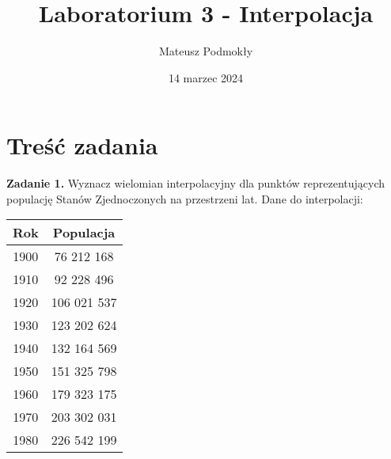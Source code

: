 \documentclass[11pt]{scrartcl}
\title{Laboratorium 3 - Interpolacja}
\author{Mateusz Podmokły}
\date{14 marzec 2024}
\begin{document}
    \maketitle

    \section{Treść zadania}
    \textbf{Zadanie 1.} Wyznacz wielomian interpolacyjny dla punktów
    reprezentujących populację Stanów Zjednoczonych na przestrzeni
    lat. Dane do interpolacji:

    \begin{table}[H]
        \centering
        \begin{tabular}{c | c}
            Rok & Populacja \\
            \hline
            1900 & 76 212 168 \\
            1910 & 92 228 496 \\
            1920 & 106 021 537 \\
            1930 & 123 202 624 \\
            1940 & 132 164 569 \\
            1950 & 151 325 798 \\
            1960 & 179 323 175 \\
            1970 & 203 302 031 \\
            1980 & 226 542 199 \\
        \end{tabular}
    \end{table}
\end{document}
